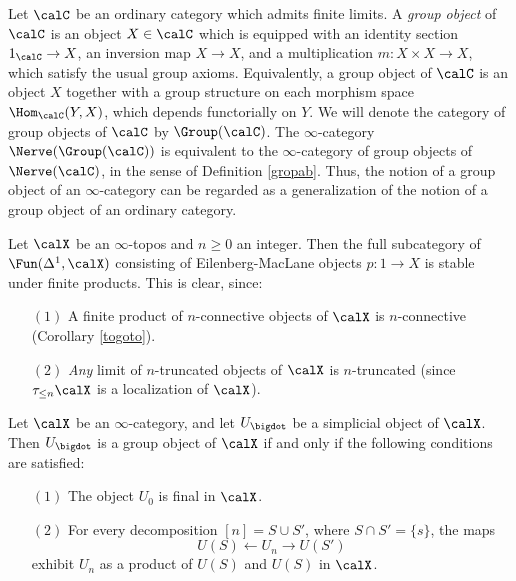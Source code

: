 \begin{example}
Let $\calC$ be an ordinary category which admits finite limits. A {\it group object}
of $\calC$ is an object $X \in \calC$ which is equipped with an identity section
$1_{\calC} \rightarrow X$, an inversion map $X \rightarrow X$, and
a multiplication $m: X \times X \rightarrow X$, which satisfy the usual group axioms. Equivalently, a group object of $\calC$ is an object $X$ together with a group structure on each morphism
space $\Hom_{\calC}(Y,X)$, which depends functorially on $Y$. We will denote the category
of group objects of $\calC$ by $\Group(\calC)$. The $\infty$-category
$\Nerve(\Group(\calC))$ is equivalent to the $\infty$-category of group objects of
$\Nerve(\calC)$, in the sense of Definition \ref{gropab}. Thus, the notion of a group object
of an $\infty$-category can be regarded as a generalization of the notion of a group object of an ordinary category.
\end{example}

\begin{remark}\label{prodem}
Let $\calX$ be an $\infty$-topos and $n \geq 0$ an integer. Then the full subcategory of
$\Fun(\Delta^1,\calX)$ consisting of Eilenberg-MacLane objects $p: 1 \rightarrow X$
is stable under finite products. 
This is clear, since:
\begin{itemize}
\item[$(1)$] A finite product of $n$-connective objects of $\calX$ is $n$-connective (Corollary \ref{togoto}).
\item[$(2)$] {\em Any} limit of $n$-truncated objects of $\calX$ is $n$-truncated (since 
$\tau_{\leq n} \calX$ is a localization of $\calX$).
\end{itemize}
\end{remark}

\begin{proposition}\label{tinner}
Let $\calX$ be an $\infty$-category, and let $U_{\bigdot}$ be a simplicial object of $\calX$. 
Then $U_{\bigdot}$ is a group object of $\calX$ if and only if the following conditions are satisfied:
\begin{itemize}
\item[$(1)$] The object $U_0$ is final in $\calX$.
\item[$(2)$] For every decomposition $[n] = S \cup S'$, where
$S \cap S' = \{s\}$, the maps
$$ U(S) \leftarrow U_n \rightarrow U(S')$$
exhibit $U_n$ as a product of $U(S)$ and $U(S)$ in $\calX$.
\end{itemize}
\end{proposition}

